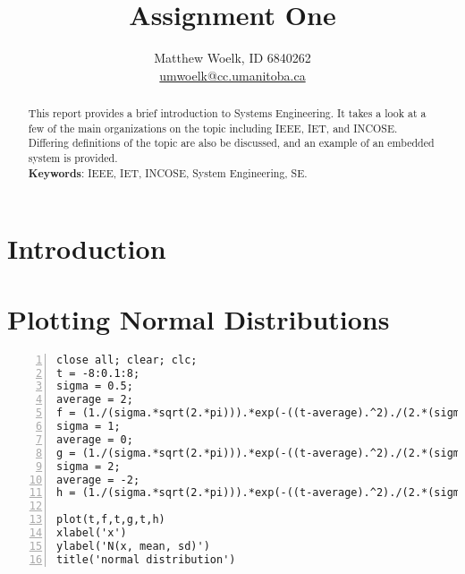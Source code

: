 \documentclass[a4paper,12pt]{article}
\title{Assignment One}
\author{Matthew Woelk, ID 6840262\\ \href{mailto:umwoelk@cc.umanitoba.ca}{umwoelk@cc.umanitoba.ca}}
\begin{document}
\maketitle
\thispagestyle{empty}

\tableofcontents

\newpage



\begin{abstract} 
This report provides a brief introduction to Systems Engineering.  It takes a look at a few of the main organizations on the topic including IEEE, IET, and INCOSE.  Differing definitions of the topic are also be discussed, and an example of an embedded system is provided.\\

{\bf Keywords}: IEEE, IET, INCOSE, System Engineering, SE. 

\end{abstract}



\section*{Introduction}




\section{Plotting Normal Distributions}

\begin{lstlisting}[numbers=left,firstnumber=1,label=lst1]
close all; clear; clc;
t = -8:0.1:8;
sigma = 0.5;
average = 2;
f = (1./(sigma.*sqrt(2.*pi))).*exp(-((t-average).^2)./(2.*(sigma.^2)));
sigma = 1;
average = 0;
g = (1./(sigma.*sqrt(2.*pi))).*exp(-((t-average).^2)./(2.*(sigma.^2)));
sigma = 2;
average = -2;
h = (1./(sigma.*sqrt(2.*pi))).*exp(-((t-average).^2)./(2.*(sigma.^2)));

plot(t,f,t,g,t,h)
xlabel('x')
ylabel('N(x, mean, sd)')
title('normal distribution')
\end{lstlisting}
\end{document}
